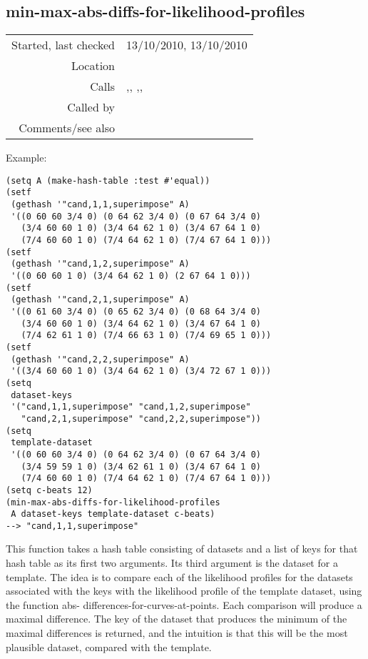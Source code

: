 \subsection*{min-max-abs-diffs-for-likelihood-profiles}\label{fun:min-max-abs-diffs-for-likelihood-profiles}

\vspace{0.3cm}
\begin{tabular}{r|p{8cm}}
Started, last checked & 13/10/2010, 13/10/2010 \\
Location & \nameref{sec:generating-beat-MNN-spacing-for-and-back} \\
Calls & \nameref{fun:abs-differences-for-curves-at-points},\newline \nameref{fun:geom-mean-likelihood-of-states}, \nameref{fun:max-item},\newline \nameref{fun:min-argmin}, \nameref{fun:nth-list-of-lists} \nameref{fun:segments-strict} \\
Called by & \nameref{fun:most-plausible-join} \\
Comments/see also &
\end{tabular}

\vspace{0.5cm}
\noindent Example:
\begin{verbatim}
(setq A (make-hash-table :test #'equal))
(setf
 (gethash '"cand,1,1,superimpose" A)
 '((0 60 60 3/4 0) (0 64 62 3/4 0) (0 67 64 3/4 0)
   (3/4 60 60 1 0) (3/4 64 62 1 0) (3/4 67 64 1 0)
   (7/4 60 60 1 0) (7/4 64 62 1 0) (7/4 67 64 1 0)))
(setf
 (gethash '"cand,1,2,superimpose" A)
 '((0 60 60 1 0) (3/4 64 62 1 0) (2 67 64 1 0)))
(setf
 (gethash '"cand,2,1,superimpose" A)
 '((0 61 60 3/4 0) (0 65 62 3/4 0) (0 68 64 3/4 0)
   (3/4 60 60 1 0) (3/4 64 62 1 0) (3/4 67 64 1 0)
   (7/4 62 61 1 0) (7/4 66 63 1 0) (7/4 69 65 1 0)))
(setf
 (gethash '"cand,2,2,superimpose" A)
 '((3/4 60 60 1 0) (3/4 64 62 1 0) (3/4 72 67 1 0)))
(setq
 dataset-keys
 '("cand,1,1,superimpose" "cand,1,2,superimpose"
   "cand,2,1,superimpose" "cand,2,2,superimpose"))
(setq
 template-dataset
 '((0 60 60 3/4 0) (0 64 62 3/4 0) (0 67 64 3/4 0)
   (3/4 59 59 1 0) (3/4 62 61 1 0) (3/4 67 64 1 0)
   (7/4 60 60 1 0) (7/4 64 62 1 0) (7/4 67 64 1 0)))
(setq c-beats 12)
(min-max-abs-diffs-for-likelihood-profiles
 A dataset-keys template-dataset c-beats)
--> "cand,1,1,superimpose"
\end{verbatim}

\noindent This function takes a hash table consisting
of datasets and a list of keys for that hash table as
its first two arguments. Its third argument is the
dataset for a template. The idea is to compare each
of the likelihood profiles for the datasets
associated with the keys with the likelihood profile
of the template dataset, using the function abs-
differences-for-curves-at-points. Each comparison will
produce a maximal difference. The key of the dataset
that produces the minimum of the maximal differences
is returned, and the intuition is that this will be
the most plausible dataset, compared with the
template.


